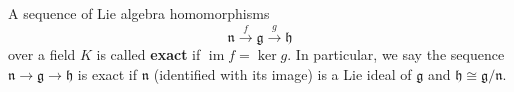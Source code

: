 A sequence of Lie algebra homomorphisms
$$
\mathfrak{n} \xrightarrow{\;f\;} \mathfrak{g} \xrightarrow{\;g\;} \mathfrak{h}
$$
over a field $K$ is called \textbf{exact} if $\operatorname{im} f = \ker g$. In particular, we say the sequence $\mathfrak{n} \to \mathfrak{g} \to \mathfrak{h}$ is exact if $\mathfrak{n}$ (identified with its image) is a Lie ideal of $\mathfrak{g}$ and $\mathfrak{h} \cong \mathfrak{g}/\mathfrak{n}$.

